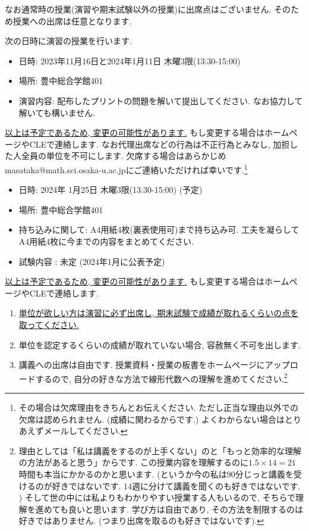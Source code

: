 \documentclass[dvipdfmx,a4paper,11pt]{article}
\theoremstyle{definition}
\begin{document}
なお通常時の授業(演習や期末試験以外の授業)に出席点はございません. そのため授業への出席は任意となります. 


\medskip
{}

次の日時に演習の授業を行います. 
\begin{itemize}
  \setlength{\parskip}{0cm} 
  \setlength{\itemsep}{0cm}
\item 日時: 2023年11月16日と2024年1月11日 木曜3限(13:30-15:00)
\item 場所: 豊中総合学館401
\item 演習内容: 配布したプリントの問題を解いて提出してください. なお協力して解いても構いません. 
\end{itemize}
\underline{以上は予定であるため, 変更の可能性があります.} もし変更する場合はホームページやCLEで連絡します. 
なお代理出席などの行為は不正行為とみなし, 加担した人全員の単位を不可にします.
欠席する場合はあらかじめmasataka@math.sci.osaka-u.ac.jpにご連絡いただければ幸いです.\footnote{その場合は欠席理由をきちんとお伝えください. ただし正当な理由以外での欠席は認められません. (成績に関わるからです.) よくわからない場合はとりあえずメールしてください.}

\newpage
{}

\begin{itemize}
  \setlength{\parskip}{0cm} 
  \setlength{\itemsep}{0cm}
\item 日時: 2024年 1月25日 木曜3限(13:30-15:00) (予定)
\item 場所: 豊中総合学館401
\item 持ち込みに関して: A4用紙4枚(裏表使用可)まで持ち込み可. 工夫を凝らしてA4用紙4枚に今までの内容をまとめてください.
\item 試験内容 : 未定 (2024年1月に公表予定)
\end{itemize}
\underline{以上は予定であるため, 変更の可能性があります.} もし変更する場合はホームページやCLEで連絡します. 

\medskip
{}
\begin{enumerate}
  \setlength{\parskip}{0cm} 
  \setlength{\itemsep}{0cm} 
\item \underline{単位が欲しい方は演習に必ず出席し, 期末試験で成績が取れるくらいの点を取ってください.} 
\item 単位を認定するくらいの成績が取れていない場合, 容赦無く不可を出します. 
\item 講義への出席は自由です. 授業資料・授業の板書をホームページにアップロードするので, 自分の好きな方法で線形代数への理解を進めてください.\footnote{理由としては「私は講義をするのが上手くない」のと「もっと効率的な理解の方法があると思う」からです. この授業内容を理解するのに$1.5 \times 14 = 21$時間も本当にかかるのかと思います. (というか今の私は90分じっと講義を受けるのが好きではないです.  14週に分けて講義を聞くのも好きではないです. ) そして世の中には私よりもわかりやすい授業する人もいるので, そちらで理解を進めても良いと思います. 学び方は自由であり, その方法を制限するのは好きではありません. (つまり出席を取るのも好きではないです).}
\end{enumerate}
\end{document}
